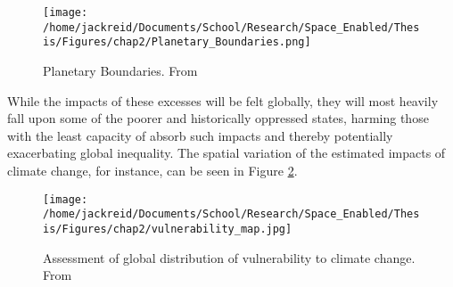 \documentclass[notitlepage]{article}
\begin{document}
\begin{figure}[h]
	\centering
	\texttt{[image: /home/jackreid/Documents/School/Research/Space\_Enabled/Thesis/Figures/chap2/Planetary\_Boundaries.png]}
	\caption[Planetary Boundaries]{Planetary Boundaries. From \cite{rockstromSafeOperatingSpace2009}}
	\label{fig:boundaries}
\end{figure}

While the impacts of these excesses will be felt globally, they will most heavily fall upon some of the poorer and historically oppressed states, harming those with the least capacity of absorb such impacts and thereby potentially exacerbating global inequality. The spatial variation of the estimated impacts of climate change, for instance, can be seen in Figure \ref{fig:vulnerability}.

\begin{figure}[h]
	\centering
	\texttt{[image: /home/jackreid/Documents/School/Research/Space\_Enabled/Thesis/Figures/chap2/vulnerability\_map.jpg]}
	\caption[Assessment of global distribution of vulnerability to climate change]{Assessment of global distribution of vulnerability to climate change. From \cite{yoheSyntheticAssessmentGlobal2006}}
	\label{fig:vulnerability}
\end{figure}
\end{document}
